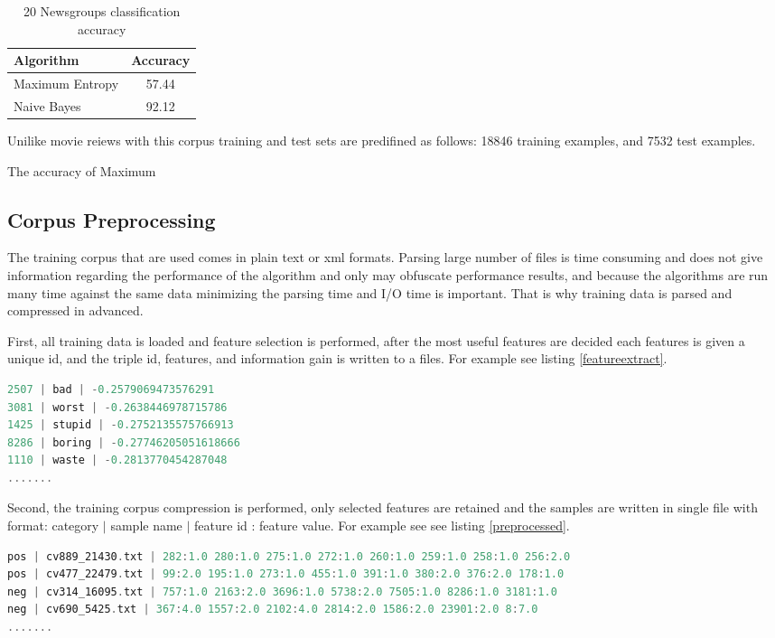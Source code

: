 \documentclass{report}
\begin{document}
\begin{table}[ht]
\centering
\begin{tabular}{ l c }
    \hline\hline
    Algorithm & Accuracy \\ [0.2ex]
    \hline
    Maximum Entropy &  57.44 \\
    Naive Bayes & 92.12  \\
    \hline
  \end{tabular}
\label{table:20nprecision}
\caption{20 Newsgroups classification accuracy}
\end{table}

Unilike movie reiews with this corpus training and test sets are predifined as follows: 18846 training examples, and 7532 test examples.

The accuracy of Maximum	  

\subsection{Corpus Preprocessing}

The training corpus that are used comes in plain text or xml formats. Parsing large number of files is time consuming and does not give information regarding the performance of the algorithm and only may obfuscate performance results, and because the algorithms are run many time against the same data minimizing the parsing time and I/O time is important. That is why training data is parsed and compressed in advanced.

First, all training data is loaded and feature selection is performed, after the most useful features are decided each features is given a unique id, and the triple id, features, and information gain is written to a files. For example see listing \ref{featureextract}.

\begin{lstlisting}[language=scala, caption={Features file extract}, label={featureextract}]
2507 | bad | -0.2579069473576291
3081 | worst | -0.2638446978715786
1425 | stupid | -0.2752135575766913
8286 | boring | -0.27746205051618666
1110 | waste | -0.2813770454287048
.......
\end{lstlisting}

Second, the training corpus compression is performed, only selected features are retained and the samples are written in single file with format: category $|$ sample name $|$ feature id : feature value. For example see  see listing \ref{preprocessed}.

\begin{lstlisting}[language=scala, caption={Preprocessed samples}, label={preprocessed}]
pos | cv889_21430.txt | 282:1.0 280:1.0 275:1.0 272:1.0 260:1.0 259:1.0 258:1.0 256:2.0
pos | cv477_22479.txt | 99:2.0 195:1.0 273:1.0 455:1.0 391:1.0 380:2.0 376:2.0 178:1.0
neg | cv314_16095.txt | 757:1.0 2163:2.0 3696:1.0 5738:2.0 7505:1.0 8286:1.0 3181:1.0
neg | cv690_5425.txt | 367:4.0 1557:2.0 2102:4.0 2814:2.0 1586:2.0 23901:2.0 8:7.0
.......
\end{lstlisting}
\end{document}
